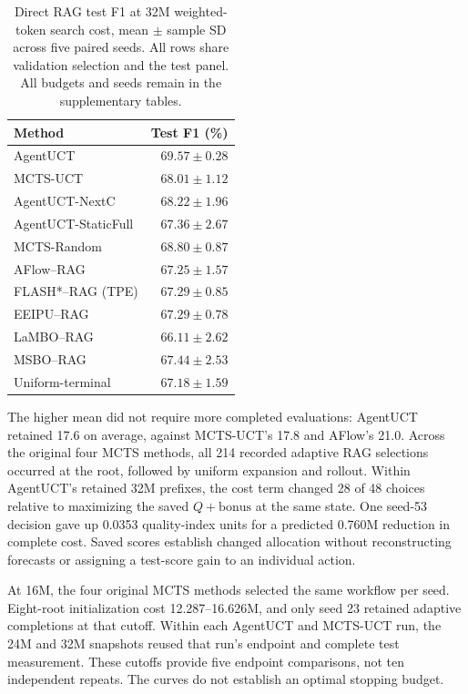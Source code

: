 \begin{table}[t]
\centering\small
\caption{Direct RAG test F1 at 32M weighted-token search cost, mean $\pm$
sample SD across five paired seeds. All rows share validation selection and
the test panel. All budgets and seeds remain in the supplementary tables.}
\label{tab:direct-algorithm-coverage}
\begin{tabular}{lr}
\toprule
Method & Test F1 (\%)\\
\midrule
AgentUCT & $69.57\pm0.28$\\
MCTS-UCT & $68.01\pm1.12$\\
AgentUCT-NextC & $68.22\pm1.96$\\
AgentUCT-StaticFull & $67.36\pm2.67$\\
MCTS-Random & $68.80\pm0.87$\\
AFlow--RAG & $67.25\pm1.57$\\
FLASH*--RAG (TPE) & $67.29\pm0.85$\\
EEIPU--RAG & $67.29\pm0.78$\\
LaMBO--RAG & $66.11\pm2.62$\\
MSBO--RAG & $67.44\pm2.53$\\
Uniform-terminal & $67.18\pm1.59$\\
\bottomrule
\end{tabular}
\end{table}

The higher mean did not require more completed evaluations: AgentUCT
retained 17.6 on average, against MCTS-UCT's 17.8 and AFlow's 21.0.
Across the original four MCTS methods, all 214 recorded adaptive RAG
selections occurred at the root, followed by uniform expansion and rollout.
Within AgentUCT's retained 32M prefixes,
the cost term changed 28 of 48 choices relative to maximizing the saved
$Q+\mathrm{bonus}$ at the same state. One seed-53 decision gave up 0.0353
quality-index units for a predicted 0.760M reduction in complete cost.
Saved scores establish changed allocation without reconstructing forecasts
or assigning a test-score gain to an individual action.

At 16M, the four original MCTS methods selected the same workflow per seed.
Eight-root initialization cost 12.287--16.626M, and only seed 23 retained
adaptive completions at that cutoff. Within each AgentUCT and MCTS-UCT run, the 24M and 32M snapshots reused
that run's endpoint and complete test measurement. These cutoffs provide
five endpoint comparisons, not ten independent repeats.
The curves do not establish an optimal stopping budget.

